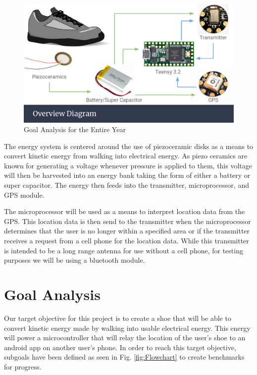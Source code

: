 \documentclass[letterpaper, 12 pt, onecolumn, hidelinks]{ieeetran}
\begin{document}
\begin{figure}[h]
	\begin{center}
		\includegraphics[trim=0 65 0 0, clip, width=\columnwidth]{OverviewDiagram.pdf}
	\end{center}
	\vspace{-1em}
	\caption{\label{fig:Diagram}Goal Analysis for the Entire Year}
\end{figure}

The energy system is centered around the use of piezoceramic disks as a means to convert kinetic energy from walking into electrical energy. As piezo ceramics are known for generating a voltage whenever pressure is applied to them, this voltage will then be harvested into an energy bank taking the form of either a battery or super capacitor. The energy then feeds into the transmitter, microprocessor, and GPS module.

The microprocessor will be used as a means to interpret location data from the GPS. This location data is then send to the transmitter when the microprocessor determines that the user is no longer within a specified area or if the transmitter receives a request from a cell phone for the location data. While this transmitter is intended to be a long range antenna for use without a cell phone, for testing purposes we will be using a bluetooth module.

\section{Goal Analysis}\label{sec:Goal}
Our target objective for this project is to create a shoe that will be able to convert kinetic energy made by walking into usable electrical energy. This energy will power a microcontroller that will relay the location of the user's shoe to an android app on another user's phone. In order to reach this target objective, subgoals have been defined as seen in Fig. \ref{fig:Flowchart} to create benchmarks for progress.
\end{document}
